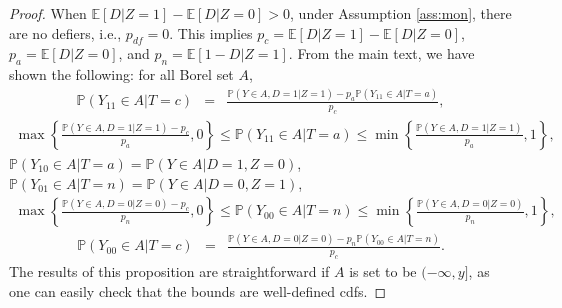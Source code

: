 \documentclass[12pt]{article}
\theoremstyle{plain}
\theoremstyle{definition}
\theoremstyle{remark}
\begin{document}
\begin{proof}
When $\mathbb{E}[D  \vert  Z=1] - \mathbb{E}[D  \vert  Z=0]> 0$, under Assumption \ref{ass:mon}, there are no defiers, i.e., $p_{df}=0$. This implies $p_c=\mathbb{E}[D  \vert  Z=1] - \mathbb{E}[D  \vert  Z=0]$, $p_a=\mathbb E[D\vert Z=0]$, and $p_n=\mathbb E[1-D\vert Z=1]$.
From the main text, we have shown the following: for all Borel set $A$, 
\begin{eqnarray*}
    \mathbb P(Y_{11} \in A \vert T=c) &=& \frac{\mathbb P(Y\in A, D=1 \vert Z=1)- p_a \mathbb P(Y_{11} \in A \vert T=a)}{p_c},
\end{eqnarray*}
\begin{eqnarray*}
   \max\left\{\frac{\mathbb P(Y\in A, D=1 \vert Z=1)- p_c}{p_a},0\right\} \leq \mathbb P(Y_{11} \in A \vert T=a) \leq \min\left\{\frac{\mathbb P(Y\in A, D=1 \vert Z=1)}{p_a},1\right\},  
\end{eqnarray*}
$\mathbb P(Y_{10}\in A \vert T=a)=\mathbb P(Y \in A \vert D=1, Z=0)$, $\mathbb P(Y_{01}\in A \vert T=n)=\mathbb P(Y \in A \vert D=0, Z=1)$,
\begin{eqnarray*}
   \max\left\{\frac{\mathbb P(Y\in A, D=0 \vert Z=0)- p_c}{p_n},0\right\} \leq \mathbb P(Y_{00} \in A \vert T=n) \leq \min\left\{\frac{\mathbb P(Y\in A, D=0 \vert Z=0)}{p_n},1\right\},  
\end{eqnarray*}
\begin{eqnarray*}
    \mathbb P(Y_{00} \in A \vert T=c) &=& \frac{\mathbb P(Y\in A, D=0 \vert Z=0)- p_n \mathbb P(Y_{00} \in A \vert T=n)}{p_c}.
\end{eqnarray*}
The results of this proposition are straightforward if $A$ is set to be $(-\infty, y]$, as one can easily check that the bounds are well-defined cdfs.  
\end{proof}
\end{document}
